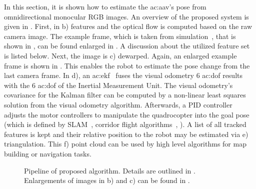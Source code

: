 In this section, it is shown how to estimate the \gls{ac:aav}'s pose from omnidirectional monocular RGB images.
An overview of the proposed system is given in .
First, in b) features and the optical flow is computed based on the raw camera image.
The example frame, which is taken from simulation~\cite{zhang2016benefit}, that is shown in , can be found enlarged in .
A discussion about the utilized feature set is listed below.
Next, the image is c) dewarped.
Again, an enlarged example frame is shown in .
This enables the robot to estimate the pose change from the last camera frame.
In d), an \gls{ac:ekf}~\cite{kalman1960new} fuses the visual odometry 6 \gls{ac:dof} results with the 6 \gls{ac:dof} of the Inertial Measurement Unit.
The visual odometry's covariance for the Kalman filter can be computed by a non-linear least squares solution from the visual odometry algorithm.
Afterwards, a PID controller adjusts the motor controllers to manipulate the quadrocopter into the goal pose (which is defined by \eg SLAM~\cite{Williams20091188}, corridor flight algorithms~\cite{Tregillus:2017:HOV:3025453.3025521,verbeke2016constraint}, \etc).
A list of all tracked features is kept and their relative position to the robot may be estimated via e) triangulation.
This f) point cloud can be used by high level algorithms for map building or navigation tasks.

\begin{figure}[]
  \centering
  
  \caption{Pipeline of proposed algorithm. Details are outlined in . Enlargements of images in b) and c) can be found in .}
  \label{fig:perception_methods_visualodometryalgorithm_flowchart}
\end{figure}

